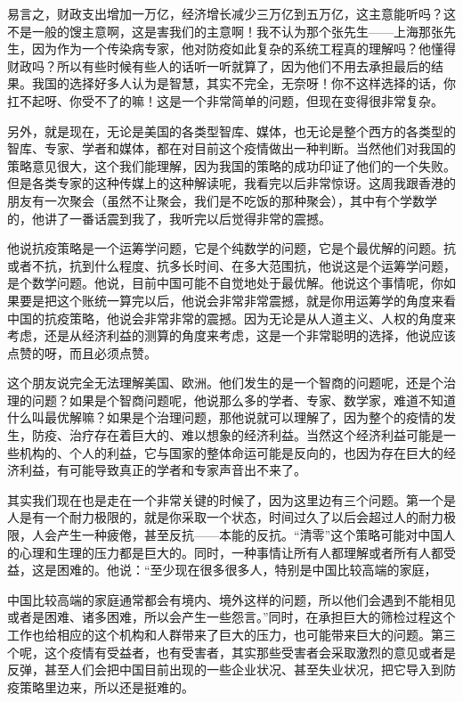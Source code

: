 \documentclass[UTF8, 12pt, a4paper]{ctexrep}
\begin{document}
易言之，财政支出增加一万亿，经济增长减少三万亿到五万亿，这主意能听吗？这不是一般的馊主意啊，这是害我们的主意啊！我不认为那个张先生——上海那张先生，因为作为一个传染病专家，他对防疫如此复杂的系统工程真的理解吗？他懂得财政吗？所以有些时候有些人的话听一听就算了，因为他们不用去承担最后的结果。我国的选择好多人认为是智慧，其实不完全，无奈呀！你不这样选择的话，你扛不起呀、你受不了的嘛！这是一个非常简单的问题，但现在变得很非常复杂。

另外，就是现在，无论是美国的各类型智库、媒体，也无论是整个西方的各类型的智库、专家、学者和媒体，都在对目前这个疫情做出一种判断。当然他们对我国的策略意见很大，这个我们能理解，因为我国的策略的成功印证了他们的一个失败。但是各类专家的这种传媒上的这种解读呢，我看完以后非常惊讶。这周我跟香港的朋友有一次聚会（虽然不让聚会，我们是不吃饭的那种聚会），其中有个学数学的，他讲了一番话震到我了，我听完以后觉得非常的震撼。

他说抗疫策略是一个运筹学问题，它是个纯数学的问题，它是个最优解的问题。抗或者不抗，抗到什么程度、抗多长时间、在多大范围抗，他说这是个运筹学问题，是个数学问题。他说，目前中国可能不自觉地处于最优解。他说这个事情呢，你如果要是把这个账统一算完以后，他说会非常非常震撼，就是你用运筹学的角度来看中国的抗疫策略，他说会非常非常的震撼。因为无论是从人道主义、人权的角度来考虑，还是从经济利益的测算的角度来考虑，这是一个非常聪明的选择，他说应该点赞的呀，而且必须点赞。

这个朋友说完全无法理解美国、欧洲。他们发生的是一个智商的问题呢，还是个治理的问题？如果是个智商问题呢，他说那么多的学者、专家、数学家，难道不知道什么叫最优解嘛？如果是个治理问题，那他说就可以理解了，因为整个的疫情的发生，防疫、治疗存在着巨大的、难以想象的经济利益。当然这个经济利益可能是一些机构的、个人的利益，它与国家的整体命运可能是反向的，也因为存在巨大的经济利益，有可能导致真正的学者和专家声音出不来了。

其实我们现在也是走在一个非常关键的时候了，因为这里边有三个问题。第一个是人是有一个耐力极限的，就是你采取一个状态，时间过久了以后会超过人的耐力极限，人会产生一种疲倦，甚至反抗——本能的反抗。“清零”这个策略可能对中国人的心理和生理的压力都是巨大的。同时，一种事情让所有人都理解或者所有人都受益，这是困难的。他说：“至少现在很多很多人，特别是中国比较高端的家庭，

中国比较高端的家庭通常都会有境内、境外这样的问题，所以他们会遇到不能相见或者是困难、诸多困难，所以会产生一些怨言。”同时，在承担巨大的筛检过程这个工作也给相应的这个机构和人群带来了巨大的压力，也可能带来巨大的问题。第三个呢，这个疫情有受益者，也有受害者，其实那些受害者会采取激烈的意见或者是反弹，甚至人们会把中国目前出现的一些企业状况、甚至失业状况，把它导入到防疫策略里边来，所以还是挺难的。
\end{document}
